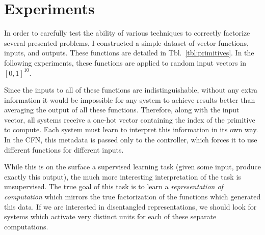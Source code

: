 \documentclass[12pt,twoside]{mitthesis}
\begin{document}
\section{Experiments}\label{experiments-1}

In order to carefully test the ability of various techniques to
correctly factorize several presented problems, I constructed a simple
dataset of vector functions, inputs, and outputs. These functions are
detailed in Tbl.~\ref{tbl:primitives}. In the following experiments,
these functions are applied to random input vectors in \([0,1]^{10}\).

Since the inputs to all of these functions are indistinguishable,
without any extra information it would be impossible for any system to
achieve results better than averaging the output of all these functions.
Therefore, along with the input vector, all systems receive a one-hot
vector containing the index of the primitive to compute. Each system
must learn to interpret this information in its own way. In the CFN,
this metadata is passed only to the controller, which forces it to use
different functions for different inputs.

While this is on the surface a supervised learning task (given some
input, produce exactly this output), the much more interesting
interpretation of the task is unsupervised. The true goal of this task
is to learn a \emph{representation of computation} which mirrors the
true factorization of the functions which generated this data. If we are
interested in disentangled representations, we should look for systems
which activate very distinct units for each of these separate
computations.
\end{document}
